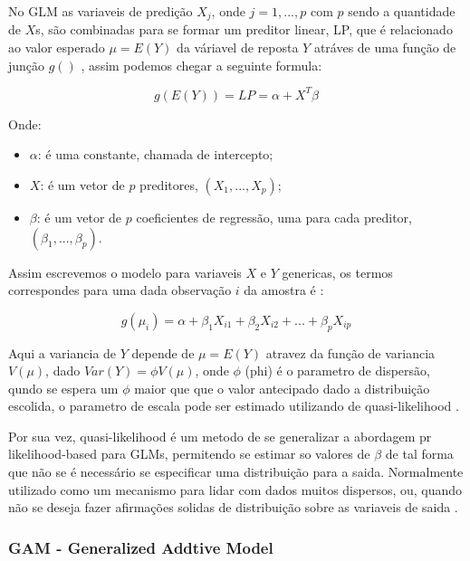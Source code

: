 \documentclass[
	12pt,				%
	openright,			%
	oneside,			%
	a4paper,			%
	english,			%
	brazil				%
	]{abntex2}
\begin{document}
No GLM as variaveis de predição $X_j$, onde $j = 1, ..., p$ com $p$ sendo a quantidade de $X$s, são combinadas para se formar um 
preditor linear, LP, que é relacionado ao valor esperado $\mu = E(Y)$ da váriavel de reposta $Y$ atráves de uma função de junção $g()$ 
\cite{GAMeGLM_especie_estudo}, assim podemos chegar a seguinte formula: 

\begin{equation}
	\label{GLM_general_eq}
	g(E(Y)) = LP = \alpha + X^T \beta
\end{equation}

Onde:
\begin{itemize}
	\item $\alpha$: é uma constante, chamada de intercepto;
	\item $X$: é um vetor de $p$ preditores, $(X_1, ..., X_p)$;
	\item $\beta$: é um vetor de $p$ coeficientes de regressão, uma para cada preditor, $(\beta_1, ..., \beta_p)$.
\end{itemize}

Assim escrevemos o modelo para variaveis $X$ e $Y$ genericas, os termos correspondes para uma dada observação $i$ da 
amostra é \cite{GAMeGLM_especie_estudo}:

\begin{equation}
	\label{GLM_observ_eq}
	g(\mu_i) = \alpha + \beta_1X_{i1} + \beta_2X_{i2} + ... + \beta_pX_{ip}
\end{equation}

Aqui a variancia de $Y$ depende de $\mu = E(Y)$ atravez da função de variancia $V(\mu)$, dado $Var(Y) = \phi V(\mu)$, onde $\phi$ (phi)
é o parametro de dispersão, qundo se espera um $\phi$ maior que que o valor antecipado dado a distribuição escolida, o parametro de
escala pode ser estimado utilizando de quasi-likelihood \cite{GAMeGLM_especie_estudo}.

Por sua vez, quasi-likelihood é um metodo de se generalizar a abordagem pr likelihood-based para GLMs, permitendo se estimar so valores
de $\beta$ de tal forma que não se é necessário se especificar uma distribuição para a saida. Normalmente utilizado como um mecanismo
para lidar com dados muitos dispersos, ou, quando não se deseja fazer afirmações solidas de distribuição sobre as variaveis de saida 
\cite{quase-likehood}.

\subsubsection{GAM - Generalized Addtive Model}
\end{document}
